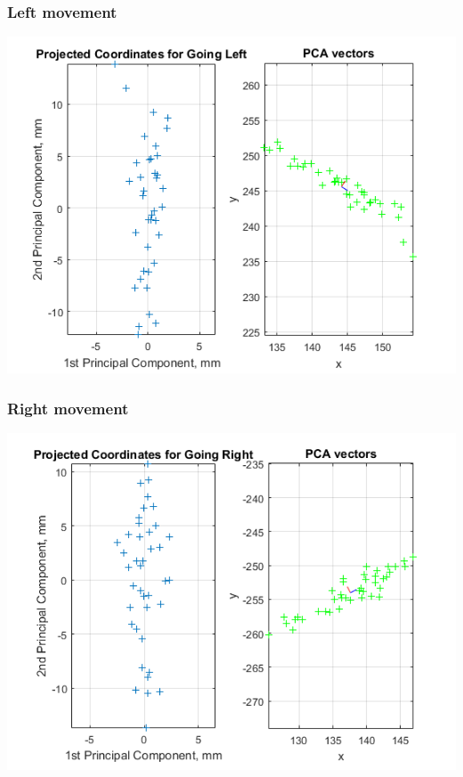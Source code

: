 \documentclass[a4paper, 12pt]{article}
\begin{document}
\subsubsection{Left movement}

\begin{center}
  \includegraphics[scale=0.8]{ll1}
\end{center}


\subsubsection{Right movement}

\begin{center}
  \includegraphics[scale=0.8]{rr1}
\end{center}
\end{document}

